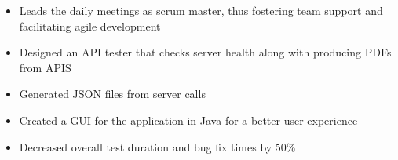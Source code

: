 \documentclass[10pt,a4paper,ragged2e,withhyper,darkmode]{altacv}
\begin{document}
\begin{paracol}{1}
\begin{itemize}
                \item{Leads the daily meetings as scrum master, thus fostering team support and facilitating agile development}
            \end{itemize}
            \begin{itemize}
                \item Designed an API tester that checks server health along with producing PDFs from APIS
                \item Generated JSON files from server calls
                \item Created a GUI for the application in Java for a better user experience
                \item Decreased overall test duration and bug fix times by 50\%
            \end{itemize}


\end{paracol}
\end{document}

